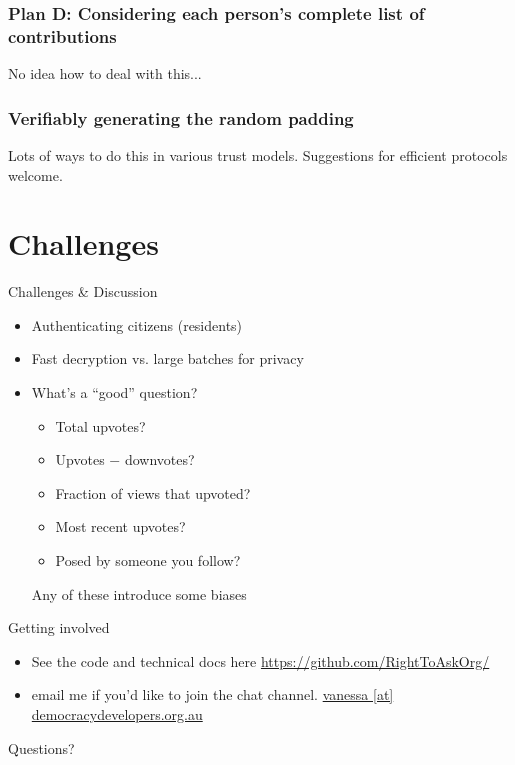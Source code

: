 \documentclass[10pt,xcolor=svgnames,169]{beamer} %
\begin{document}
\begin{frame}
	\frametitle{Plan D: Considering each person's complete list of contributions}
	No idea how to deal with this...
\end{frame}
			

\begin{frame}
	\frametitle{Verifiably generating the random padding}
	Lots of ways to do this in various trust models. Suggestions for efficient protocols welcome.
\end{frame}
			
	\section{Challenges}
	
	\begin{frame}{Challenges \& Discussion}
		\begin{itemize}
			\item Authenticating citizens (residents)
			\item Fast decryption vs. large batches for privacy
			\item What's a ``good'' question?
				\begin{itemize}
					\item Total upvotes?
					\item Upvotes $-$ downvotes?
					\item Fraction of views that upvoted?
					\item Most recent upvotes?
					\item Posed by someone you follow?
				\end{itemize}
			
			Any of these introduce some biases
		\end{itemize}
	\end{frame}

\begin{frame}{Getting involved}
	
	\begin{itemize}
		\item See the code and technical docs here
	\url{https://github.com/RightToAskOrg/}
	\item email me if you'd like to join the chat channel.
	\url{vanessa [at] democracydevelopers.org.au}
	\end{itemize}
\end{frame}

	{ %
		\begin{frame}[standout]
			Questions? 
		\end{frame}
	}
	
	
\end{document}
